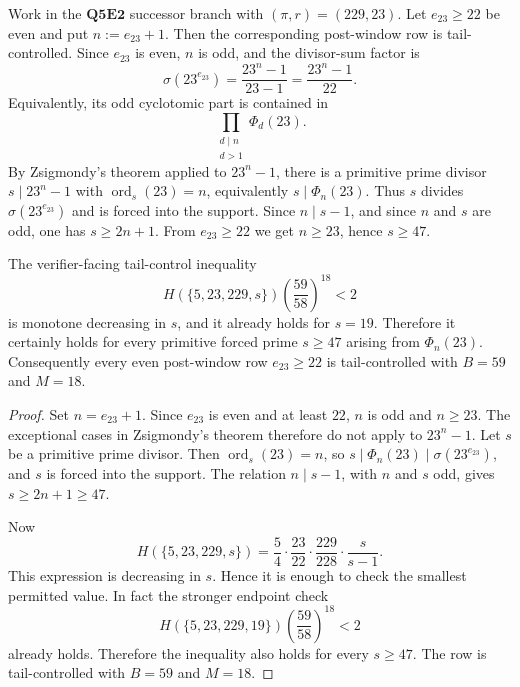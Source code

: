 \begin{criterion}[Parametric post-window closure for \texorpdfstring{\((\pi,r)=(229,23)\)}{(pi,r)=(229,23)}]
\label{crit:q5e2-pi229-r23-parametric-post-window}
Work in the \(\mathbf{Q5E2}\) successor branch with \((\pi,r)=(229,23)\).
Let \(e_{23}\ge22\) be even and put \(n:=e_{23}+1\).  Then the corresponding
post-window row is tail-controlled.  Since \(e_{23}\) is even, \(n\) is odd,
and the divisor-sum factor is
\[
  \sigma(23^{e_{23}})
  =
  \frac{23^n-1}{23-1}
  =
  \frac{23^n-1}{22}.
\]
Equivalently, its odd cyclotomic part is contained in
\[
  \prod_{\substack{d\mid n\\ d>1}}\Phi_d(23).
\]
By Zsigmondy's theorem applied to \(23^n-1\), there is a primitive prime
divisor \(s\mid23^n-1\) with \(\operatorname{ord}_s(23)=n\), equivalently
\(s\mid\Phi_n(23)\).  Thus \(s\) divides \(\sigma(23^{e_{23}})\) and is forced
into the support.  Since \(n\mid s-1\), and since \(n\) and \(s\) are odd, one
has \(s\ge2n+1\).  From \(e_{23}\ge22\) we get \(n\ge23\), hence \(s\ge47\).

The verifier-facing tail-control inequality
\[
  H(\{5,23,229,s\})
  \left(\frac{59}{58}\right)^{18}<2
\]
is monotone decreasing in \(s\), and it already holds for \(s=19\).  Therefore
it certainly holds for every primitive forced prime \(s\ge47\) arising from
\(\Phi_n(23)\).  Consequently every even post-window row \(e_{23}\ge22\) is
tail-controlled with \(B=59\) and \(M=18\).
\end{criterion}

\begin{proof}
Set \(n=e_{23}+1\).  Since \(e_{23}\) is even and at least \(22\), \(n\) is odd
and \(n\ge23\).  The exceptional cases in Zsigmondy's theorem therefore do not
apply to \(23^n-1\).  Let \(s\) be a primitive prime divisor.  Then
\(\operatorname{ord}_s(23)=n\), so
\(s\mid\Phi_n(23)\mid\sigma(23^{e_{23}})\), and \(s\) is forced into the
support.  The relation \(n\mid s-1\), with \(n\) and \(s\) odd, gives
\(s\ge2n+1\ge47\).

Now
\[
  H(\{5,23,229,s\})
  =
  \frac54\cdot\frac{23}{22}\cdot\frac{229}{228}\cdot\frac{s}{s-1}.
\]
This expression is decreasing in \(s\).  Hence it is enough to check the
smallest permitted value.  In fact the stronger endpoint check
\[
  H(\{5,23,229,19\})
  \left(\frac{59}{58}\right)^{18}<2
\]
already holds.  Therefore the inequality also holds for every \(s\ge47\).
The row is tail-controlled with \(B=59\) and \(M=18\).
\end{proof}



